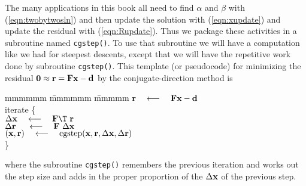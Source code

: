 \par
The many applications in this book all need to
find $\alpha$ and $\beta$ with (\ref{eqn:twobytwosln}) and then
update the solution with (\ref{eqn:xupdate}) and
update the residual with (\ref{eqn:Rupdate}).
Thus we package these activities in a subroutine
named \texttt{cgstep()}.
To use that subroutine we will have a computation 
like we had for steepest descents, except that we
will have the repetitive work done by subroutine {\tt cgstep()}.
This template (or pseudocode) for minimizing the residual
$\bold 0\approx \bold r = \bold F \bold x - \bold d$
by the conjugate-direction method is
\label{lsq/'cgtemplate'}
\begin{tabbing}
mmmmmm \= mmmmmm \= mmmmm \kill
\> $\bold r \quad\longleftarrow\quad \bold F \bold x - \bold d$                \\
\> {\rm iterate \{ }                                                    \\
\>      \>  $\Delta \bold x   \padarrow \bold F\T\         \bold r$      \\
\>      \>  $\Delta \bold r\  \quad\longleftarrow\quad \bold F \  \Delta \bold x$      \\
\>      \>  $(\bold x,\bold r) \quad\longleftarrow\quad {\rm cgstep}
             (\bold x,\bold r, \Delta\bold x,\Delta\bold r )$
        \\
\>      \> \}                                           
\end{tabbing}
where
the subroutine {\tt cgstep()}
remembers the previous iteration and
works out the step size and adds in
the proper proportion of the $\Delta \bold x$ of
the previous step.


